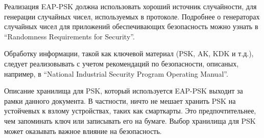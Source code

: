 Реализация EAP-PSK должна использовать хороший источник случайности, для генерации случайных чисел, используемых в протоколе. Подробнее о генераторах случайных чисел для приложений обеспечивающих безопасность можно узнать в ``Randomness Requirements for Security''.

Обработку информации, такой как ключевой материал (PSK, AK, KDK и т.д.), следует реализовывать с учетом рекомендаций по безопасности, описаных, например, в ``National Industrial Security Program Operating Manual''.

Описание хранилища для PSK, который используется EAP-PSK выходит за рамки данного документа. В частности, ничто не мешает хранить PSK на устойчевых к взлому устройствах, таких как смарткарты. Это предпочтительнее, чем запоминать ключ или записывать его на бумаге. Выбор хранилища для PSK может оказывать важное влияние на безопасность.
